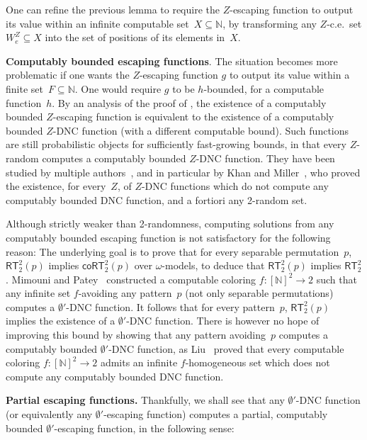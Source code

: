 \documentclass{article}
\numberwithin{theorem}{section}
\newcommand{\RT}[0]{\mathsf{RT}}
\newcommand{\coRT}[0]{\mathsf{coRT}}
\newcommand{\NN}[0]{\mathbb{N}}
\begin{document}
One can refine the previous lemma to require the $Z$-escaping function to output its value within an infinite computable set~$X \subseteq \NN$, by transforming any $Z$-c.e.\ set $W_e^Z \subseteq X$ into the set of positions of its elements in~$X$. 

\bigskip
\noindent
\textbf{Computably bounded escaping functions}.
The situation becomes more problematic if one wants the $Z$-escaping function $g$ to output its value within a finite set~$F \subseteq \NN$. One would require $g$ to be $h$-bounded, for a computable function~$h$. By an analysis of the proof of , the existence of a computably bounded $Z$-escaping function is equivalent to the existence of a computably bounded $Z$-DNC function (with a different computable bound). Such functions are still probabilistic objects for sufficiently fast-growing bounds, in that every $Z$-random computes a computably bounded $Z$-DNC function. They have been studied by multiple authors~\cite{beros2024imunity,greenberg2011diagonally}, and in particular by Khan and Miller~\cite{khan2017forcing}, who proved the existence, for every~$Z$, of $Z$-DNC functions which do not compute any computably bounded DNC function, and a fortiori any 2-random set.

Although strictly weaker than 2-randomness, computing solutions from any computably bounded escaping function is not satisfactory for the following reason: The underlying goal is to prove that for every separable permutation~$p$, $\RT^2_2(p)$ implies $\coRT^2_2(p)$ over $\omega$-models, to deduce that $\RT^2_2(p)$ implies $\RT^2_2$. Mimouni and Patey~\cite{mimouni2025ramseylike} constructed a computable coloring $f : [\NN]^2 \to 2$ such that any infinite set $f$-avoiding any pattern~$p$ (not only separable permutations) computes a $\emptyset'$-DNC function. It follows that for every pattern~$p$, $\RT^2_2(p)$ implies the existence of a $\emptyset'$-DNC function. There is however no hope of improving this bound by showing that any pattern avoiding~$p$ computes a computably bounded $\emptyset'$-DNC function, as Liu~\cite{liu2015cone} proved that every computable coloring $f : [\NN]^2 \to 2$ admits an infinite $f$-homogeneous set which does not compute any computably bounded DNC function.

\bigskip
\noindent
\textbf{Partial escaping functions.}
Thankfully, we shall see that any $\emptyset'$-DNC function (or equivalently any $\emptyset'$-escaping function) computes a partial, computably bounded $\emptyset'$-escaping function, in the following sense:
\end{document}
